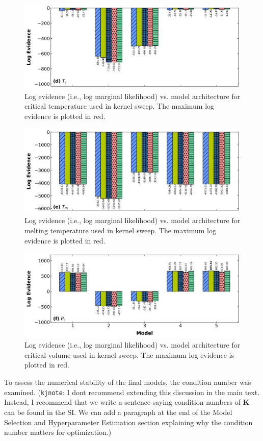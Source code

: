 \documentclass[journal=jacsat,manuscript=article]{achemso}
\newcommand{\kjnote}[1]{{\color{Blue} (\texttt{kjnote}: #1)}}
\begin{document}
\begin{figure}
    \centering
    \includegraphics[width=\linewidth]{images/lml_bar_chart_Tc.png}
    \caption{Log evidence (i.e., log marginal likelihood) vs. model architecture for critical temperature used in kernel sweep. The maximum log evidence is plotted in red.}
\end{figure}
\begin{figure}
    \centering
    \includegraphics[width=\linewidth]{images/lml_bar_chart_Tm.png}
    \caption{Log evidence (i.e., log marginal likelihood) vs. model architecture for melting temperature used in kernel sweep. The maximum log evidence is plotted in red.}
\end{figure}
\begin{figure}
    \centering
    \includegraphics[width=\linewidth]{images/lml_bar_chart_Vc.png}
    \caption{Log evidence (i.e., log marginal likelihood) vs. model architecture for critical volume used in kernel sweep. The maximum log evidence is plotted in red.}
\end{figure}
To assess the numerical stability of the final models, the condition number was examined. \kjnote{I dont recommend extending this discussion in the main text. Instead, I recommend that we write a sentence saying condition numbers of $\mathbf{K}$ can be found in the SI. We can add a paragraph at the end of the Model Selection and Hyperparameter Estimation section explaining why the condition number matters for optimization.}
\FloatBarrier
\end{document}
